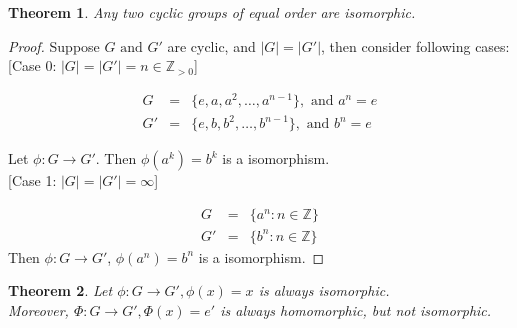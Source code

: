 \documentclass{article}
\theoremstyle{MyNonumberplain}
\theoremstyle{break}
\newtheorem*{proof}{Proof. }
\newcommand{\p}{\phi}
\newcommand{\infixand}{\text{ and }}
\theoremstyle{break}
\newtheorem{theorem}{Theorem}[section]
\theoremstyle{break}
\theoremstyle{definition}
\theoremstyle{break}
\begin{document}
\begin{thmbox}
    \begin{theorem}
        Any two cyclic groups of equal order are isomorphic. 
    \end{theorem}
    \begin{prfbox}
        \begin{proof}
            Suppose $G \infixand G'$ are cyclic, and $| G | = | G' |$, then consider
            following cases:\\
            
                [Case 0: $| G | = | G' | = n \in \mathbb{Z}_{> 0}$]

            \begin{eqnarray*}
                G & = & \{ e, a, a^2, \ldots, a^{n - 1} \}, \infixand a^n = e\\
                G' & = & \{ e, b, b^2, \ldots, b^{n - 1} \}, \infixand b^n = e
            \end{eqnarray*}

            Let $\p : G \rightarrow G'$. Then $\p (a^k) = b^k$ is a isomorphism.\\
            

                [Case 1: $| G | = | G' | = \infty$]

            \begin{eqnarray*}
            G & = & \{ a^n : n \in \mathbb{Z} \}\\
            G' & = & \{ b^n : n \in \mathbb{Z} \}
            \end{eqnarray*}
            Then $\p : G \rightarrow G'$, $\p (a^n) = b^n$ is a isomorphism.
        \end{proof}
    \end{prfbox}
\end{thmbox}

\begin{thmbox}
    \begin{theorem}
        Let $\p : G \rightarrow G', \p (x) = x$ is always isomorphic.\\

        Moreover, $\Phi : G \rightarrow G', \Phi (x) = e'$ is always homomorphic, but
        not isomorphic.
    \end{theorem}

\end{thmbox}
\end{document}
